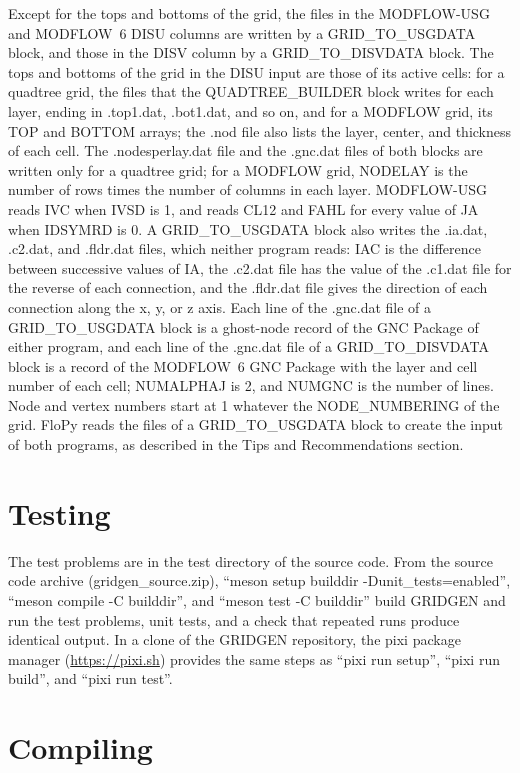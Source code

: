 \documentclass[11pt,twoside,twocolumn]{usgsreport}
\begin{document}
Except for the tops and bottoms of the grid, the files in the MODFLOW-USG and MODFLOW~6 DISU columns are written by a GRID\_TO\_USGDATA block, and those in the DISV column by a GRID\_TO\_DISVDATA block. The tops and bottoms of the grid in the DISU input are those of its active cells: for a quadtree grid, the files that the QUADTREE\_BUILDER block writes for each layer, ending in .top1.dat, .bot1.dat, and so on, and for a MODFLOW grid, its TOP and BOTTOM arrays; the .nod file also lists the layer, center, and thickness of each cell. The .nodesperlay.dat file and the .gnc.dat files of both blocks are written only for a quadtree grid; for a MODFLOW grid, NODELAY is the number of rows times the number of columns in each layer. MODFLOW-USG reads IVC when IVSD is 1, and reads CL12 and FAHL for every value of JA when IDSYMRD is 0. A GRID\_TO\_USGDATA block also writes the .ia.dat, .c2.dat, and .fldr.dat files, which neither program reads: IAC is the difference between successive values of IA, the .c2.dat file has the value of the .c1.dat file for the reverse of each connection, and the .fldr.dat file gives the direction of each connection along the x, y, or z axis. Each line of the .gnc.dat file of a GRID\_TO\_USGDATA block is a ghost-node record of the GNC Package of either program, and each line of the .gnc.dat file of a GRID\_TO\_DISVDATA block is a record of the MODFLOW~6 GNC Package with the layer and cell number of each cell; NUMALPHAJ is 2, and NUMGNC is the number of lines. Node and vertex numbers start at 1 whatever the NODE\_NUMBERING of the grid. FloPy reads the files of a GRID\_TO\_USGDATA block to create the input of both programs, as described in the Tips and Recommendations section.

\section{Testing}

The test problems are in the test directory of the source code. From the source code archive (gridgen\_source.zip), ``meson setup builddir -Dunit\_tests=enabled'', ``meson compile -C builddir'', and ``meson test -C builddir'' build GRIDGEN and run the test problems, unit tests, and a check that repeated runs produce identical output. In a clone of the GRIDGEN repository, the pixi package manager (\url{https://pixi.sh}) provides the same steps as ``pixi run setup'', ``pixi run build'', and ``pixi run test''.

\section{Compiling}
\end{document}
